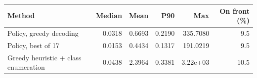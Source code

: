 \begin{tabular}{lrrrrr}
\toprule
Method & Median & Mean & P90 & Max & On front (\%)\\
\midrule
Policy, greedy decoding & 0.0318 & 0.6693 & 0.2190 & 335.7080 & 9.5\\
Policy, best of 17 & 0.0153 & 0.4434 & 0.1317 & 191.0219 & 9.5\\
Greedy heuristic + class enumeration & 0.0438 & 2.3964 & 0.3381 & 3.22e+03 & 10.5\\
\bottomrule
\end{tabular}
